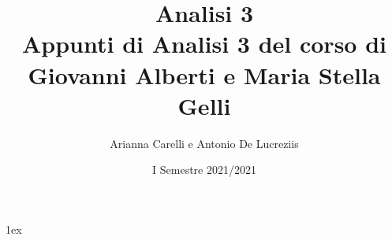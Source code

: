 \documentclass[a4paper, 12pt]{report}
\title{{\Huge Analisi 3}\\{\small Appunti di Analisi 3 del corso di Giovanni Alberti e Maria Stella Gelli}}
\author{Arianna Carelli e Antonio De Lucreziis}
\date{I Semestre 2021/2021}
\begin{document}
%
%
\parskip 1ex
\setlength{\parindent}{0pt}

\maketitle

\tableofcontents

\newpage









































\end{document}
